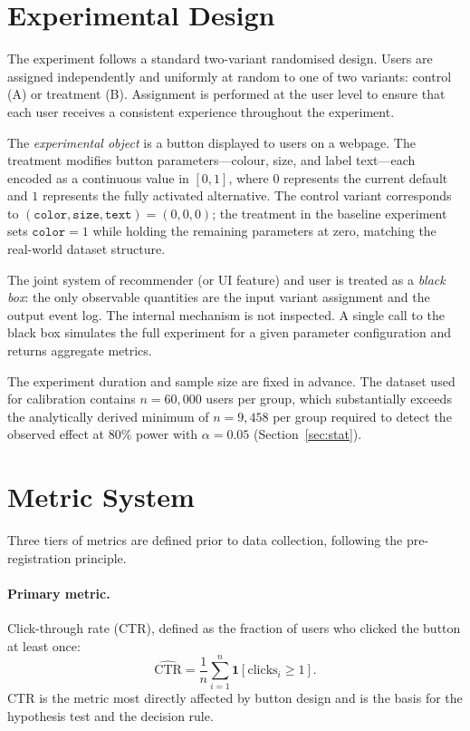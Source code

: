 \documentclass[a4paper,12pt]{extarticle}
\numberwithin{equation}{section}
\begin{document}
\clearpage

\section{Experimental Design}

The experiment follows a standard two-variant randomised design.
Users are assigned independently and uniformly at random to one
of two variants: control (A) or treatment (B). Assignment is
performed at the user level to ensure that each user receives a
consistent experience throughout the experiment.

The \emph{experimental object} is a button displayed to users on
a webpage. The treatment modifies button parameters---colour,
size, and label text---each encoded as a continuous value in
$[0, 1]$, where $0$ represents the current default and $1$
represents the fully activated alternative. The control variant
corresponds to $(\texttt{color}, \texttt{size}, \texttt{text})
= (0, 0, 0)$; the treatment in the baseline experiment sets
$\texttt{color} = 1$ while holding the remaining parameters at
zero, matching the real-world dataset structure.

The joint system of recommender (or UI feature) and user is
treated as a \emph{black box}: the only observable quantities
are the input variant assignment and the output event log. The
internal mechanism is not inspected. A single call to the black
box simulates the full experiment for a given parameter
configuration and returns aggregate metrics.

The experiment duration and sample size are fixed in advance.
The dataset used for calibration contains $n = 60{,}000$ users
per group, which substantially exceeds the analytically derived
minimum of $n = 9{,}458$ per group required to detect the
observed effect at $80\%$ power with $\alpha = 0.05$
(Section~\ref{sec:stat}).

\section{Metric System}

Three tiers of metrics are defined prior to data collection,
following the pre-registration principle.

\paragraph{Primary metric.} Click-through rate (CTR), defined
as the fraction of users who clicked the button at least once:
\[
    \widehat{\mathrm{CTR}} = \frac{1}{n} \sum_{i=1}^{n}
    \mathbf{1}[\text{clicks}_i \geq 1].
\]
CTR is the metric most directly affected by button design and
is the basis for the hypothesis test and the decision rule.
\end{document}
